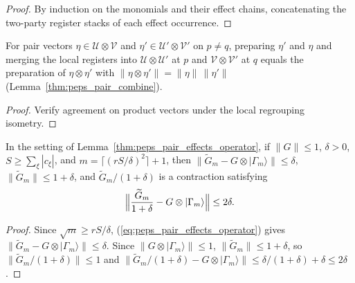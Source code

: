 \begin{proof}\leanok
    By induction on the monomials and their effect chains, concatenating the
    two-party register stacks of each effect occurrence.
\end{proof}

\begin{lemma}
    \label{thm:peps_party_combine_sources}
    \leanok
    For pair vectors $\eta\in\mathcal U\otimes\mathcal V$ and
    $\eta'\in\mathcal U'\otimes\mathcal V'$ on $p\ne q$, preparing $\eta'$ and
    $\eta$ and merging the local registers into $\mathcal U\otimes\mathcal U'$
    at $p$ and $\mathcal V\otimes\mathcal V'$ at $q$ equals the preparation of
    $\eta\otimes\eta'$ with $\|\eta\otimes\eta'\|=\|\eta\|\,\|\eta'\|$
    (Lemma~\ref{thm:peps_pair_combine}).
\end{lemma}

\begin{proof}\leanok
    Verify agreement on product vectors under the local regrouping isometry.
\end{proof}

\begin{lemma}
    \label{cor:peps_pair_effects_rescaling}
    \leanok
    In the setting of Lemma~\ref{thm:peps_pair_effects_operator}, if
    $\|G\|\le 1$, $\delta>0$, $S\ge\sum_\xi|c_\xi|$, and
    $m=\lceil(rS/\delta)^2\rceil+1$, then
    $\|\widetilde G_m-G\otimes|\Gamma_m\rangle\|\le\delta$,
    $\|\widetilde G_m\|\le1+\delta$, and $\widetilde G_m/(1+\delta)$ is a
    contraction satisfying
    \begin{align}
        \Bigl\|\frac{\widetilde G_m}{1+\delta}-G\otimes|\Gamma_m\rangle\Bigr\|
        \le 2\delta.
        \label{eq:peps_pair_effects_rescaling}
    \end{align}
\end{lemma}

\begin{proof}\leanok
    Since $\sqrt m\ge rS/\delta$, (\ref{eq:peps_pair_effects_operator}) gives
    $\|\widetilde G_m-G\otimes|\Gamma_m\rangle\|\le\delta$. Since
    $\|G\otimes|\Gamma_m\rangle\|\le 1$, $\|\widetilde G_m\|\le 1+\delta$, so
    $\|\widetilde G_m/(1+\delta)\|\le 1$ and
    $\|\widetilde G_m/(1+\delta)-G\otimes|\Gamma_m\rangle\|\le\delta/(1+\delta)+\delta\le 2\delta$.
\end{proof}
